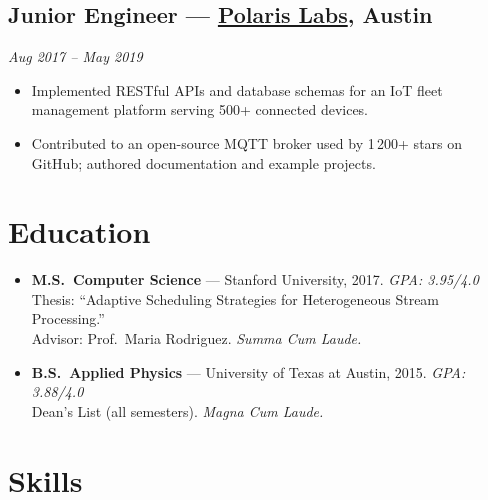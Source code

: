 \documentclass[
    language=english,
    doctype=cv,
    institution=none,
    titlestyle=simple
]{../../omnilatex}
\begin{document}
\subsection{Junior Engineer --- \href{https://polarislabs.io}{Polaris Labs}, Austin}
\textit{Aug 2017 -- May 2019}
\begin{itemize}
    \item Implemented RESTful APIs and database schemas for an IoT fleet management platform serving 500+ connected devices.
    \item Contributed to an open-source MQTT broker used by 1\,200+ stars on GitHub; authored documentation and example projects.
\end{itemize}

\section{\texorpdfstring{\color{cvsection}}{} \hspace{4pt}Education}

\begin{itemize}
    \item \textbf{M.S.\ Computer Science} --- Stanford University, 2017. \hfill \textit{GPA: 3.95/4.0}\\
        Thesis: ``Adaptive Scheduling Strategies for Heterogeneous Stream Processing.''\\
        Advisor: Prof.\ Maria Rodriguez. \textit{Summa Cum Laude.}
    \item \textbf{B.S.\ Applied Physics} --- University of Texas at Austin, 2015. \hfill \textit{GPA: 3.88/4.0}\\
        Dean's List (all semesters). \textit{Magna Cum Laude.}
\end{itemize}

\section{\texorpdfstring{\color{cvsection}}{} \hspace{4pt}Skills}
\end{document}
